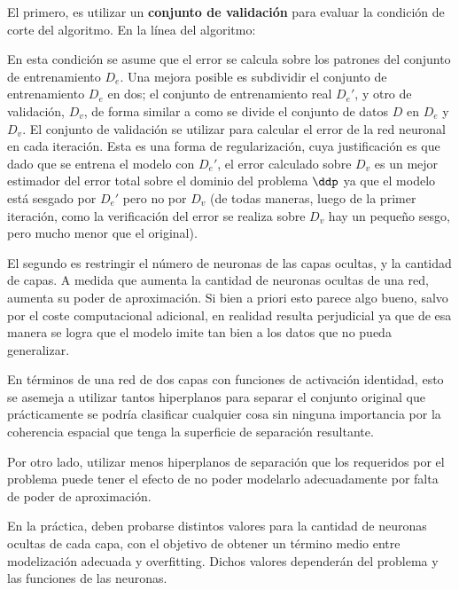 El primero, es utilizar un \textbf{conjunto de validación} para evaluar la condición de corte del algoritmo. En la línea del algoritmo:


En esta condición se asume que el error se calcula sobre los patrones del conjunto de entrenamiento $D_e$. Una mejora posible es subdividir el conjunto de entrenamiento  $D_e$ en dos; el conjunto de entrenamiento real $D_e'$, y otro de validación, $D_v$, de forma similar a como se divide el conjunto de datos $D$ en $D_e$ y $D_v$. El conjunto de validación se utilizar para calcular el error de la red neuronal en cada iteración. Esta es una forma de regularización, cuya justificación es que dado que se entrena el modelo con $D_e'$, el error calculado sobre $D_v$ es un mejor estimador del error total sobre el dominio del problema $\ddp$ ya que el modelo está sesgado por $D_e'$ pero no por $D_v$ (de todas maneras, luego de la primer iteración, como la verificación del error se realiza sobre $D_v$ hay un pequeño sesgo, pero mucho menor que el original).

El segundo es restringir el número de neuronas de las capas ocultas, y la cantidad de capas. A medida que aumenta la cantidad de neuronas ocultas de una red, aumenta su poder de aproximación. Si bien a priori esto parece algo bueno, salvo por el coste computacional adicional, en realidad resulta perjudicial ya que de esa manera se logra que el modelo imite tan bien a los datos que no pueda generalizar.

En términos de una red de dos capas con funciones de activación identidad, esto se asemeja a utilizar tantos hiperplanos para separar el conjunto original que prácticamente se podría clasificar cualquier cosa sin ninguna importancia por la coherencia espacial que tenga la superficie de separación resultante.


Por otro lado, utilizar menos hiperplanos de separación que los requeridos por el problema puede tener el efecto de no poder modelarlo adecuadamente por falta de poder de aproximación.



En la práctica, deben probarse distintos valores para la cantidad de neuronas ocultas de cada capa, con el objetivo de obtener un término medio entre modelización adecuada y overfitting. Dichos valores dependerán del problema y las funciones de las neuronas.
 

